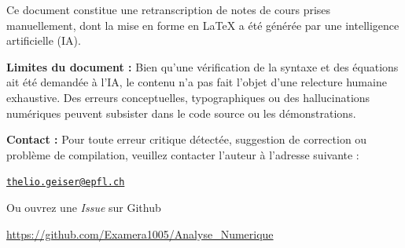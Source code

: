 \begin{tcolorbox}[colback=red!5!white,colframe=red!75!black,title={\Huge Avertissement et Responsabilité}]

    \large Ce document constitue une retranscription de notes de cours prises manuellement, dont la mise en forme en \LaTeX{} a été générée par une intelligence artificielle (IA). 

    

    \textbf{Limites du document :} Bien qu'une vérification de la syntaxe et des équations ait été demandée à l'IA, le contenu n'a pas fait l'objet d'une relecture humaine exhaustive. Des erreurs conceptuelles, typographiques ou des hallucinations numériques peuvent subsister dans le code source ou les démonstrations. 

    

    \textbf{Contact :} Pour toute erreur critique détectée, suggestion de correction ou problème de compilation, veuillez contacter l'auteur à l'adresse suivante : 

    \begin{center}

        \href{mailto:thelio.geiser@epfl.ch}{\texttt{thelio.geiser@epfl.ch}}

    \end{center}
    \centering Ou ouvrez une \textit{Issue} sur Github
    \begin{center}
        \url{https://github.com/Examera1005/Analyse_Numerique}
    \end{center}

\end{tcolorbox}